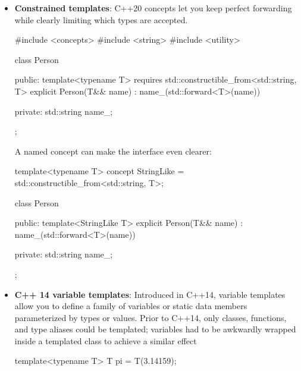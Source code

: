 \documentclass{report}
\begin{document}
\begin{itemize}
\begin{cppcode}
{                    if constexpr (std::integral<U>) {
                        processId(value);
                    } else {
                        processName(std::forward<T>(value));
                    }
                }
            \end{cppcode}
        \item \textbf{Constrained templates}: C++20 concepts let you keep perfect forwarding while clearly limiting which types are accepted.
            \bigbreak \noindent 
            \begin{cppcode}
            #include <concepts>
            #include <string>
            #include <utility>

            class Person {
            public:
                template<typename T>
                    requires std::constructible_from<std::string, T>
                explicit Person(T&& name)
                    : name_(std::forward<T>(name)) {}

            private:
                std::string name_;
            };
            \end{cppcode}
            \bigbreak \noindent 
            A named concept can make the interface even clearer:
            \bigbreak \noindent 
            \begin{cppcode}
            template<typename T>
            concept StringLike =
                std::constructible_from<std::string, T>;

            class Person {
            public:
                template<StringLike T>
                explicit Person(T&& name)
                    : name_(std::forward<T>(name)) {}

            private:
                std::string name_;
            };
            \end{cppcode}
        \item \textbf{C++ 14 variable templates}: Introduced in C++14, variable templates allow you to define a family of variables or static data members parameterized by types or values. Prior to C++14, only classes, functions, and type aliases could be templated; variables had to be awkwardly wrapped inside a templated class to achieve a similar effect
            \bigbreak \noindent 
            \begin{cppcode}
            template<typename T> T pi = T(3.14159);


\end{cppcode}
\end{itemize}
\end{document}
